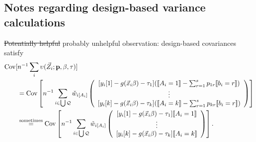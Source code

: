 \documentclass{article}
\DeclarePairedDelimiter{\indicator}{\llbracket}{\rrbracket}
\newcommand{\owt}[1][{[a_i]}]{\ensuremath{\check{w}_{i#1}}}
\begin{document}
\subsection{Notes regarding design-based variance calculations}

\st{Potentially helpful} probably unhelpful observation:
design-based covariances satisfy
\begin{align*}
  \operatorname{Cov}[&n^{-1}\sum_{i}\upsilon(\vec{Z}_{i};
  \mathbf{p}, \beta, \tau)] \\
                     &=   \operatorname{Cov}\left[n^{-1}\sum_{i \in \bigcup \mathcal{Q}}
                       \owt[{[A_{i}]}]
\left(
                                             \begin{array}{c}                                               
           [y_{i}[1]
                                               -
                                               g(\vec{x}_{i}\beta)-\tau_{1}](
                                               \indicator{A_{i}=1} - \sum_{r=1}^{s}p_{1r}\indicator{b_{i}=r})\\
                  \vdots \\
{}           [y_{i}[k]
                                               - g(\vec{x}_{i}\beta) -
                                               \tau_{k}](\indicator{A_{i}=k}
                                               - \sum_{r=1}^{s}p_{kr}\indicator{b_{i}=r})\\                                             \end{array}
\right) \right]\\
                     &\stackrel{\text{sometimes}}{=}  \operatorname{Cov}\left[n^{-1}\sum_{i \in \bigcup \mathcal{Q}}
\owt[{[A_{i}]}]
\left(
                                             \begin{array}{c}                                               
           [y_{i}[1]
                                               -
                                               g(\vec{x}_{i}\beta)-\tau_{1}]
                                               \indicator{A_{i}=1}\\
                  \vdots \\
{}           [y_{i}[k]
                                               - g(\vec{x}_{i}\beta) -
                                               \tau_{k}]\indicator{A_{i}=k}\\                                             \end{array}
\right)
\right].
\end{align*}
\end{document}
